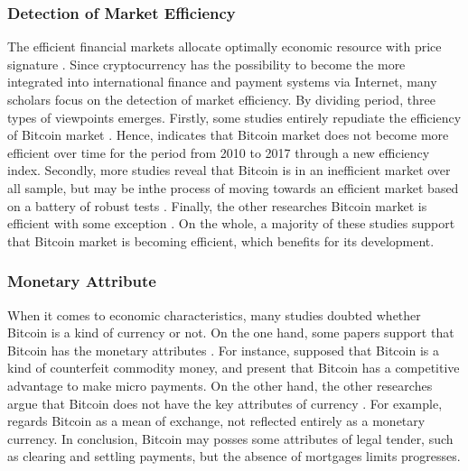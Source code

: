 \documentclass[review]{elsarticle}
\begin{document}
\subsubsection{Detection of Market Efficiency}
The efficient financial markets allocate optimally economic resource with price signature \cite{Fama1970}. Since cryptocurrency has the possibility to become the more integrated into international finance and payment systems via Internet, many scholars focus on the detection of market efficiency. By dividing period, three types of viewpoints emerges. Firstly, some studies  entirely repudiate the efficiency of Bitcoin market \cite{Jiang2018}. Hence, \cite{Jiang2018} indicates that Bitcoin market does not become more efficient over time for the period from 2010 to 2017 through a new efficiency index. Secondly, more studies reveal that Bitcoin is in an inefficient market over all sample, but may be inthe process of moving towards an efficient market based on a battery of robust tests \cite{urquhart2016inefficiency, Bariviera2017, Alvarez-Ramirez2018, Khuntia2018, Vidal-Tomas2018, Sensoy2019}. Finally, the other researches Bitcoin market is efficient with some exception \cite{Kristoufek2018}. On the whole, a majority of these studies support that Bitcoin market is becoming efficient, which benefits for its development.

\subsubsection{Monetary Attribute}
When it comes to economic characteristics, many studies doubted whether Bitcoin is a kind of currency or not. On the one hand, some papers support that Bitcoin has the monetary attributes \cite{Selgin2015}. For instance, \cite{Selgin2015} supposed that Bitcoin is a kind of counterfeit commodity money, and  \cite{Grinberg2012} present that Bitcoin has a competitive advantage to make micro payments. On the other hand, the other researches argue that Bitcoin does not have the key attributes of currency \cite{Wu2014, Glaser2014, polasik2015price}. For example, \cite{polasik2015price} regards Bitcoin as a mean of exchange, not reflected entirely as a monetary currency. In conclusion, Bitcoin may posses some attributes of legal tender, such as clearing and settling payments, but the absence of mortgages limits progresses.
\end{document}
